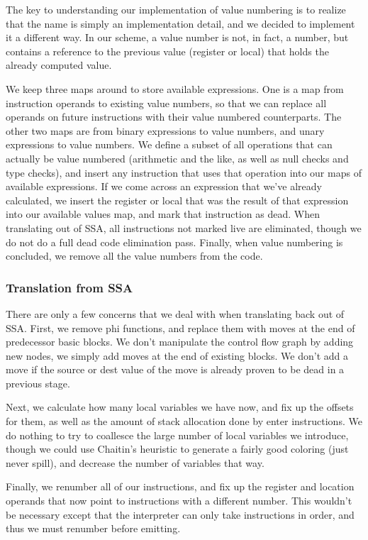 \documentclass[12pt,letterpaper]{article}
\begin{document}
The key to understanding our implementation of value numbering is to
realize that the name is simply an implementation detail, and we
decided to implement it a different way. In our scheme, a value number
is not, in fact, a number, but contains a reference to the previous
value (register or local) that holds the already computed value.

We keep three maps around to store available expressions. One is a map
from instruction operands to existing value numbers, so that we can
replace all operands on future instructions with their value numbered
counterparts. The other two maps are from binary expressions to value
numbers, and unary expressions to value numbers. We define a subset of
all operations that can actually be value numbered (arithmetic and the
like, as well as null checks and type checks), and insert any
instruction that uses that operation into our maps of available
expressions. If we come across an expression that we've already
calculated, we insert the register or local that was the result of
that expression into our available values map, and mark that
instruction as dead. When translating out of SSA, all instructions not
marked live are eliminated, though we do not do a full dead code
elimination pass. Finally, when value numbering is concluded, we
remove all the value numbers from the code.

\subsubsection*{Translation from SSA}

There are only a few concerns that we deal with when translating back
out of SSA. First, we remove phi functions, and replace them with
moves at the end of predecessor basic blocks. We don't manipulate the
control flow graph by adding new nodes, we simply add moves at the end
of existing blocks. We don't add a move if the source or dest value of
the move is already proven to be dead in a previous stage.

Next, we calculate how many local variables we have now, and fix up
the offsets for them, as well as the amount of stack allocation done
by enter instructions. We do nothing to try to coallesce the large
number of local variables we introduce, though we could use Chaitin's
heuristic to generate a fairly good coloring (just never spill), and
decrease the number of variables that way.

Finally, we renumber all of our instructions, and fix up the register
and location operands that now point to instructions with a different
number. This wouldn't be necessary except that the interpreter can
only take instructions in order, and thus we must renumber before
emitting.
\end{document}
